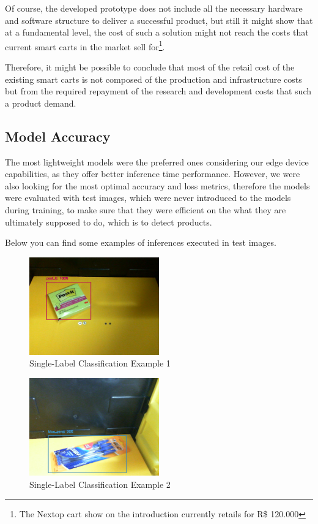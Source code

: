 \documentclass[openright]{normas-utf-tex} %
\begin{document}
Of course, the developed prototype does not include all the necessary hardware
and software structure to deliver a successful product, but still it might show that at a
fundamental level, the cost of such a solution might not reach the costs that
current smart carts in the market sell for\footnote{The Nextop cart show on the
introduction currently retails for R\$ 120.000}.

Therefore, it might be possible to conclude that most of the retail cost of the
existing smart carts is not composed of the production and infrastructure costs
but from the required repayment of the research and development costs that such
a product demand.

\subsection{Model Accuracy}

The most lightweight models were the preferred ones considering our edge device capabilities,
as they offer better inference time performance. 
However, we were also looking for the most optimal accuracy and loss metrics, 
therefore the models were evaluated with test images, which were never introduced to the models
during training, to make sure that they were efficient on the what they are ultimately supposed to do, 
which is to detect products.

Below you can find some examples of inferences executed in test images. 

\begin{figure}[H]
	\centering
	\includegraphics[width=0.5\textwidth]{./images/singlelabel-classification-1.png}
	\caption[Single-Label Classification Example 1]{Single-Label Classification Example 1}
\end{figure}

\begin{figure}[H]
	\centering
	\includegraphics[width=0.5\textwidth]{./images/singlelabel-classification-2.png}
	\caption[Single-Label Classification Example 2]{Single-Label Classification Example 2}
\end{figure}
\end{document}
